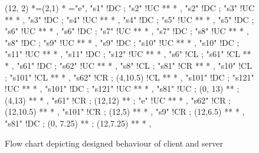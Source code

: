 \begin{figure}[Hbt]
(12, 2)  	 *=(2,1)  							*\frm{-} ="e",
%
"s1" !DC ; "s2" !UC **\dir{-} *\dir{>} ,
"s2" !DC ; "s3" !UC **\dir{-} *\dir{>} ,
"s3" !DC ; "s4" !UC **\dir{-} *\dir{>} ,
"s4" !DC ; "s5" !UC **\dir{-} *\dir{>} ,
"s5" !DC ; "s6" !UC **\dir{-} *\dir{>} ,
"s6" !DC ; "s7" !UC **\dir{-} *\dir{>} ,
"s7"  !DC ; "s8"  !UC **\dir{-} *\dir{>} ,
"s8"  !DC ; "s9"  !UC **\dir{-} *\dir{>} ,
"s9"  !DC ; "s10" !UC **\dir{-} *\dir{>} ,
"s10" !DC ; "s11" !UC **\dir{-} *\dir{>} ,
"s11" !DC ; "s12" !UC **\dir{-} *\dir{>} ,
%
"s6"  !CL ; "s61" !CL **\dir{-} *\dir{>} ,
"s61" !DC ; "s62" !UC **\dir{-} *\dir{>} ,
%
"s8"  !CL ; "s81" !CR **\dir{-} *\dir{>} ,
%
"s10"  !CL ; "s101" !CL **\dir{-} *\dir{>} ,
%
"s62"  !CR ; (4,10.5) !CL **\dir{-} *\dir{>} ,
%
"s101"  !DC ; "s121" !UC **\dir{-} *\dir{>} ,
%
"s101"  !DC ; "s121" !UC **\dir{-} *\dir{>} ,
%
"s81"  !UC ; (0, 13) **\dir{-} ; (4,13) **\dir{-} *\dir{>} ,
%
"s61"  !CR ; (12,12) **\dir{-} ; "e" !UC **\dir{-} *\dir{>} ,
"s62"  !CR ; (12,10.5) **\dir{-} *\dir{>} ,
%
"s101"  !CR ; (12,5) **\dir{-} *\dir{>} ,
%
"s9"  !CR ; (12,6.5) **\dir{-} *\dir{>} ,
%
"s81"  !DC ; (0, 7.25) **\dir{-} ; (12,7.25) **\dir{-} *\dir{>} ,
\endxy


\caption{Flow chart depicting designed behaviour of client and server}

\end{figure}
